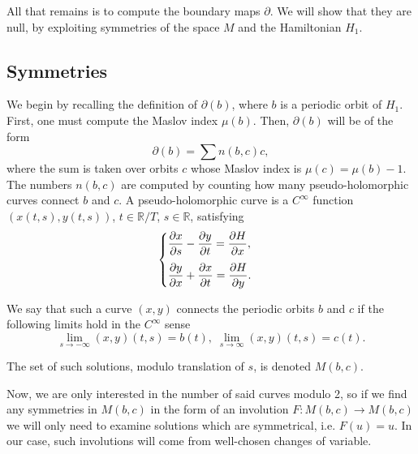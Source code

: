 \documentclass{article}
\theoremstyle{nonumberplain}
\newcommand{\R}{\mathbb{R}}
\newcommand{\moduli}{M}
\begin{document}
All that remains is to compute the boundary maps $\partial$. We will show that they are null, by exploiting symmetries of the space $M$ and the Hamiltonian $H_1$.

\subsection{Symmetries}

We begin by recalling the definition of $\partial(b)$, where $b$ is a periodic orbit of $H_1$. First, one must compute the Maslov index $\mu(b)$. Then, $\partial(b)$ will be of the form
\begin{equation}
\partial(b) = \sum n(b,c) c,
\end{equation}
where the sum is taken over orbits $c$ whose Maslov index is $\mu(c) = \mu(b)-1$. The numbers $n(b,c)$ are computed by counting how many pseudo-holomorphic curves connect $b$ and $c$. A pseudo-holomorphic curve is a $C^\infty$ function $(x(t,s), y(t,s))$, $t \in \R / T$, $s \in \R$, satisfying
\begin{equation}
\begin{cases}
\displaystyle \diffp x s - \diffp y t = \diffp H x,\\[1em]
\displaystyle \diffp y x + \diffp x t = \diffp H y.
\end{cases}
\end{equation}

We say that such a curve $(x,y)$ connects the periodic orbits $b$ and $c$ if the following limits hold in the $C^\infty$ sense
\begin{equation}
\lim_{s \to -\infty} (x,y)(t,s) = b(t), \; \lim_{s \to \infty} (x,y)(t,s) = c(t).
\end{equation}

The set of such solutions, modulo translation of $s$, is denoted $\moduli(b,c)$.

Now, we are only interested in the number of said curves modulo 2, so if we find any symmetries in $\moduli(b,c)$ in the form of an involution $F \colon \moduli(b,c) \to \moduli(b,c)$ we will only need to examine solutions which are symmetrical, i.e. $F(u) = u$. In our case, such involutions will come from well-chosen changes of variable.




\end{document}

